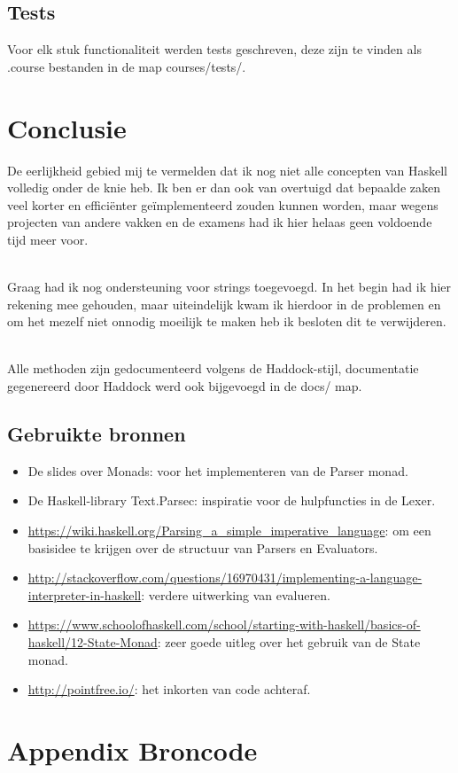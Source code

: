 \documentclass[12pt,a4paper]{report}
\begin{document}
\section{Tests}
Voor elk stuk functionaliteit werden tests geschreven, deze zijn te vinden als .course bestanden in de map courses/tests/.
\chapter{Conclusie}
De eerlijkheid gebied mij te vermelden dat ik nog niet alle concepten van Haskell volledig onder de knie heb. Ik ben er dan ook van overtuigd dat bepaalde zaken veel korter en efficiënter geïmplementeerd zouden kunnen worden, maar wegens projecten van andere vakken en de examens had ik hier helaas geen voldoende tijd meer voor.\par\mbox{}\\
Graag had ik nog ondersteuning voor strings toegevoegd. In het begin had ik hier rekening mee gehouden, maar uiteindelijk kwam ik hierdoor in de problemen en om het mezelf niet onnodig moeilijk te maken heb ik besloten dit te verwijderen.\par\mbox{}\\
Alle methoden zijn gedocumenteerd volgens de Haddock-stijl, documentatie gegenereerd door Haddock werd ook bijgevoegd in de docs/ map.
\section{Gebruikte bronnen}
\begin{itemize}
  \item De slides over Monads: voor het implementeren van de Parser monad.
  \item De Haskell-library Text.Parsec: inspiratie voor de hulpfuncties in de Lexer.
  \item \url{https://wiki.haskell.org/Parsing_a_simple_imperative_language}: om een basisidee te krijgen over de structuur van Parsers en Evaluators.
  \item \url{http://stackoverflow.com/questions/16970431/implementing-a-language-interpreter-in-haskell}: verdere uitwerking van evalueren.
  \item \url{https://www.schoolofhaskell.com/school/starting-with-haskell/basics-of-haskell/12-State-Monad}: zeer goede uitleg over het gebruik van de State monad.
  \item \url{http://pointfree.io/}: het inkorten van code achteraf.
\end{itemize}
\newpage
\chapter{Appendix Broncode}
\end{document}
